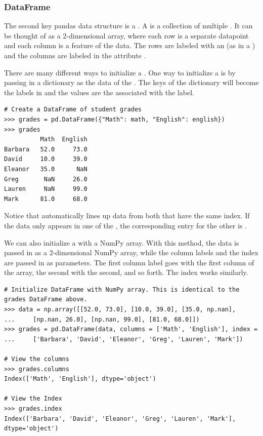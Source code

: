 \subsubsection*{DataFrame}

The second key pandas data structure is a .
A  is a collection of multiple .
It can be thought of as a 2-dimensional array, where each row is a separate datapoint and each column is a feature of the data.
The rows are labeled with an  (as in a ) and the columns are labeled in the attribute .

There are many different ways to initialize a .
One way to initialize a  is by passing in a dictionary as the data of the .
The keys of the dictionary will become the labels in  and the values are the  associated with the label.

\begin{lstlisting}
# Create a DataFrame of student grades
>>> grades = pd.DataFrame({"Math": math, "English": english})
>>> grades
	      Math  English
Barbara   52.0     73.0
David     10.0     39.0
Eleanor   35.0      NaN
Greg       NaN     26.0
Lauren     NaN     99.0
Mark      81.0     68.0
\end{lstlisting}

Notice that  automatically lines up data from both  that have the same index.
If the data only appears in one of the , the corresponding entry for the other  is .

We can also initialize a  with a NumPy array.
With this method, the data is passed in as a 2-dimensional NumPy array, while the column labels and the index are passed in as parameters.
The first column label goes with the first column of the array, the second with the second, and so forth.
The index works similarly.

\begin{lstlisting}
# Initialize DataFrame with NumPy array. This is identical to the grades DataFrame above.
>>> data = np.array([[52.0, 73.0], [10.0, 39.0], [35.0, np.nan],
...		[np.nan, 26.0], [np.nan, 99.0], [81.0, 68.0]])
>>> grades = pd.DataFrame(data, columns = ['Math', 'English'], index =
...		['Barbara', 'David', 'Eleanor', 'Greg', 'Lauren', 'Mark'])

# View the columns
>>> grades.columns
Index(['Math', 'English'], dtype='object')

# View the Index
>>> grades.index
Index(['Barbara', 'David', 'Eleanor', 'Greg', 'Lauren', 'Mark'], dtype='object')
\end{lstlisting}

